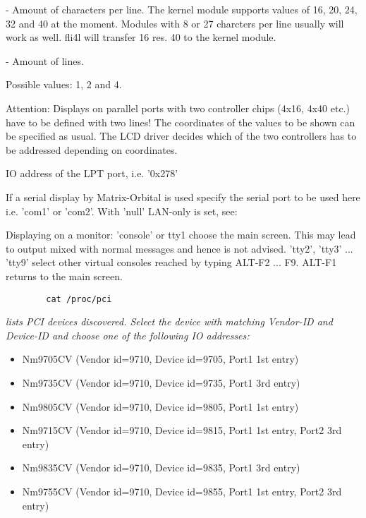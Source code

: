 \begin{description}
   - Amount of characters per line.
  The kernel module supports values of 16, 20, 24, 32 and 40 at the moment. 
  Modules with 8 or 27 charcters per line usually will work as well.
  fli4l will transfer 16 res. 40 to the kernel module.

 - Amount of lines. 

    Possible values: 1, 2 and 4.
    
    Attention: Displays on parallel ports with two controller chips (4x16,
    4x40 etc.)  have to be defined with two lines! The coordinates of the 
    values to be shown can be specified as usual. The LCD driver decides 
    which of the two controllers has to be addressed depending on coordinates.
    

      IO address of the LPT port, i.e. '0x278'
      
      If a serial display by Matrix-Orbital is used specify the serial port 
      to be used here i.e. 'com1' or 'com2'. With 'null' LAN-only is set, see: 
      
      Displaying on a monitor:
      'console' or tty1 choose the main screen. This may lead to output mixed 
      with normal messages and hence is not advised. 'tty2', 'tty3' ... 'tty9' 
      select other virtual consoles reached by typing ALT-F2 ... F9. ALT-F1 
      returns to the main screen.


\begin{example}
\begin{verbatim}
        cat /proc/pci
\end{verbatim}
\end{example}

        \emph{lists PCI devices discovered. Select the device with matching 
        Vendor-ID and Device-ID and choose one of the following IO addresses:}

        \begin{itemize}
        \item Nm9705CV  (Vendor id=9710, Device id=9705, Port1 1st entry)
        \item Nm9735CV  (Vendor id=9710, Device id=9735, Port1 3rd entry)
        \item Nm9805CV  (Vendor id=9710, Device id=9805, Port1 1st entry)
        \item Nm9715CV  (Vendor id=9710, Device id=9815, Port1 1st entry, Port2 3rd entry)
        \item Nm9835CV  (Vendor id=9710, Device id=9835, Port1 3rd entry)
        \item Nm9755CV  (Vendor id=9710, Device id=9855, Port1 1st entry, Port2 3rd entry)
        \end{itemize}


\end{description}
